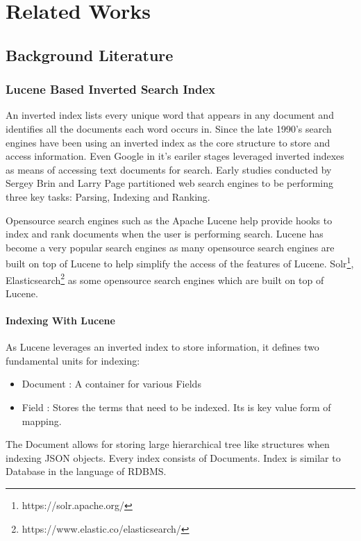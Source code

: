 \chapter{Related Works}
\label{relatedwork}

\section{Background Literature}
\label{relatedwork:background}

\subsection{Lucene Based Inverted Search Index}
An inverted index lists every unique word that appears in any document and identifies all the documents each word occurs in. Since the late 1990's search engines have been using an inverted index as the core structure to store and access information. Even Google in it's eariler stages leveraged inverted indexes as means of accessing text documents for search\parencite{brin1998anatomy}. Early studies conducted by Sergey Brin and Larry Page partitioned web search engines to be performing three key tasks: Parsing, Indexing and Ranking.

Opensource search engines such as the Apache Lucene\parencite{lucene2010apache} help provide hooks to index and rank documents when the user is performing search. Lucene has become a very popular search engines as many opensource search engines are built on top of Lucene to help simplify the access of the features of Lucene. Solr\footnote{https://solr.apache.org/}, Elasticsearch\footnote{https://www.elastic.co/elasticsearch/} as some opensource search engines which are built on top of Lucene. 

\subsubsection{Indexing With Lucene}
As Lucene leverages an inverted index to store information, it defines two fundamental units for indexing:
\begin{itemize}
    \item Document : A container for various Fields
    \item Field : Stores the terms that need to be indexed. Its is key value form of mapping. 
\end{itemize}
The Document allows for storing large hierarchical tree like structures when indexing JSON objects. Every index consists of Documents. Index is similar to Database in the language of RDBMS. 

